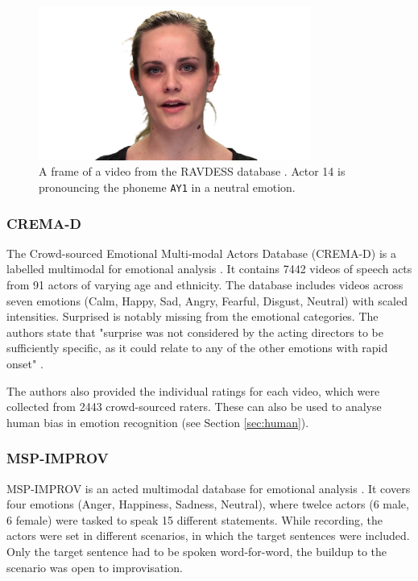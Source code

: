 \begin{figure}
    \centering
    \includegraphics[width=0.8\textwidth]{res/img_ravdess_example_neutral_14AY1.png}
    \caption{A frame of a video from the RAVDESS database \cite{livingstone2018ryerson}. Actor 14 is pronouncing the phoneme \texttt{AY1} in a neutral emotion.}
    \label{fig:ravdess_example}
\end{figure}

\subsubsection{CREMA-D}
The Crowd-sourced Emotional Multi-modal Actors Database (CREMA-D) is a labelled multimodal for emotional analysis \cite{cao2014crema}. It contains 7442 videos of speech acts from 91 actors of varying age and ethnicity. The database includes videos across seven emotions (Calm, Happy, Sad, Angry, Fearful, Disgust, Neutral) with scaled intensities. Surprised is notably missing from the emotional categories. The authors state that "surprise was not considered by the acting directors to be sufficiently specific, as it could relate to any of the other emotions with rapid onset" \cite{cao2014crema}. 

The authors also provided the individual ratings for each video, which were collected from 2443 crowd-sourced raters. These can also be used to analyse human bias in emotion recognition (see Section \ref{sec:human}).

\subsubsection{MSP-IMPROV}
MSP-IMPROV is an acted multimodal database for emotional analysis \cite{busso2016msp}. It covers four emotions (Anger, Happiness, Sadness, Neutral), where twelce actors (6 male, 6 female) were tasked to speak 15 different statements. While recording, the actors were set in different scenarios, in which the target sentences were included. Only the target sentence had to be spoken word-for-word, the buildup to the scenario was open to improvisation.

